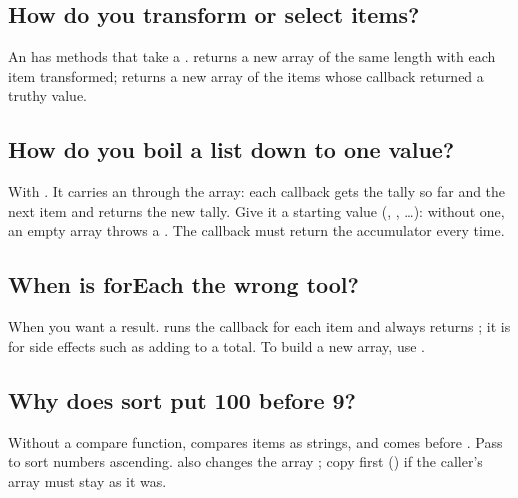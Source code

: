 \label{ch:c06}

\subsection{How do you transform or select items?}%
An  has methods that take a .  returns a new array of the same length with each item transformed;  returns a new array of the items whose callback returned a truthy value.

\subsection{How do you boil a list down to one value?}%
With . It carries an  through the array: each callback gets the tally so far and the next item and returns the new tally. Give it a starting value (, \code{\{\}}, \ldots): without one, an empty array throws a . The callback must return the accumulator every time.

\subsection{When is forEach the wrong tool?}%
When you want a result.  runs the callback for each item and always returns ; it is for side effects such as adding to a total. To build a new array, use .

\subsection{Why does sort put 100 before 9?}%
Without a compare function,  compares items as strings, and  comes before . Pass  to sort numbers ascending.  also changes the array ; copy first (\code{[...nums]}) if the caller's array must stay as it was.

